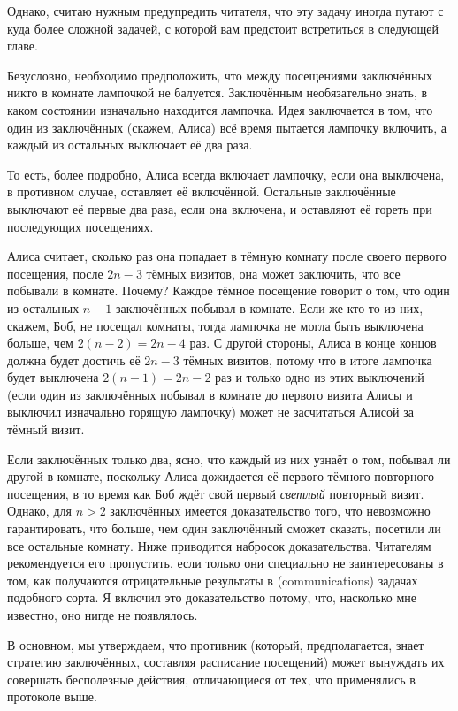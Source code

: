 Однако, считаю нужным предупредить читателя, что эту задачу иногда путают с куда более сложной задачей, с которой вам предстоит встретиться в следующей главе.

\medskip

Безусловно, необходимо предположить, что между посещениями заключённых никто в комнате лампочкой не балуется.
Заключённым необязательно знать, в каком состоянии изначально находится лампочка.
Идея заключается в том, что один из заключённых (скажем, Алиса) всё время пытается лампочку включить, а каждый из остальных выключает её два раза.

То есть, более подробно, Алиса всегда включает лампочку, если она выключена, в противном случае, оставляет её включённой.
Остальные заключённые выключают её первые два раза, если она включена, и оставляют её гореть при последующих посещениях.

Алиса считает, сколько раз она попадает в тёмную комнату после своего первого 
посещения, после $2n-3$ тёмных визитов, она может заключить, что все побывали в комнате.
Почему?
Каждое тёмное посещение говорит о том, что один из остальных $n-1$ заключённых побывал в комнате.
Если же кто-то из них, скажем, Боб, не посещал комнаты, тогда лампочка не могла быть выключена больше, чем $2(n-2)=2n-4$ раз.
С другой стороны, Алиса в конце концов должна будет достичь её $2n-3$ тёмных визитов, потому что в итоге лампочка будет выключена $2(n-1)=2n-2$
раз и только одно из этих выключений (если один из заключённых побывал в комнате до первого визита Алисы и выключил изначально горящую лампочку) может не засчитаться Алисой за тёмный визит.

Если заключённых только два, ясно, что каждый из них узнаёт о том, побывал ли другой в комнате, поскольку Алиса дожидается её первого тёмного повторного посещения, в то время как Боб ждёт свой первый \emph{светлый} повторный визит.
Однако, для $n>2$ заключённых имеется доказательство того, что невозможно гарантировать, что больше, чем один заключённый сможет сказать, посетили ли все остальные комнату.
Ниже приводится набросок доказательства.
Читателям рекомендуется его пропустить, если только они специально не заинтересованы в том, как получаются отрицательные результаты в (communications) задачах подобного сорта.
Я включил это доказательство потому, что, насколько мне известно, оно нигде не появлялось.

В основном, мы утверждаем, что противник (который, предполагается, 
знает стратегию заключённых, составляя расписание посещений) может вынуждать их совершать бесполезные действия, отличающиеся от тех, что применялись в протоколе выше.

